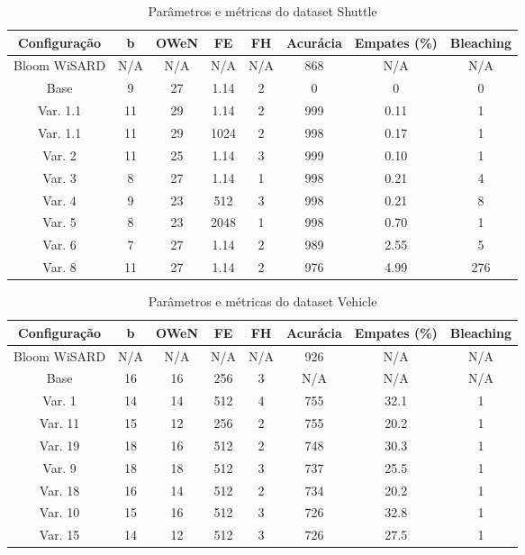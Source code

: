 \documentclass{article}
\begin{document}
{\begin{table}[H]
\caption{Parâmetros e métricas do dataset Shuttle}
\begin{tabular}{|c|c|c|c|c|c|c|c|}
\hline
\textbf{Configuração} & \textbf{b} & \textbf{OWeN} & \textbf{FE} & \textbf{FH} & \textbf{Acurácia} & \textbf{Empates (\%)} & \textbf{Bleaching} \\
\hline
Bloom WiSARD & N/A & N/A & N/A & N/A & 868 & N/A & N/A \\
\hline
Base & 9 & 27 & 1.14 & 2 & 0 & 0 & 0 \\
\hline
Var. 1.1 & 11 & 29 & 1.14 & 2 & 999 & 0.11 & 1 \\
\hline
Var. 1.1 & 11 & 29 & 1024 & 2 & 998 & 0.17 & 1 \\
\hline
Var. 2 & 11 & 25 & 1.14 & 3 & 999 & 0.10 & 1 \\
\hline
Var. 3 & 8 & 27 & 1.14 & 1 & 998 & 0.21 & 4 \\
\hline
Var. 4 & 9 & 23 & 512 & 3 & 998 & 0.21 & 8 \\
\hline
Var. 5 & 8 & 23 & 2048 & 1 & 998 & 0.70 & 1 \\
\hline
Var. 6 & 7 & 27 & 1.14 & 2 & 989 & 2.55 & 5 \\
\hline
Var. 8 & 11 & 27 & 1.14 & 2 & 976 & 4.99 & 276 \\
\hline
\end{tabular}
\end{table}

\begin{table}[H]
\caption{Parâmetros e métricas do dataset Vehicle}
\begin{tabular}{|c|c|c|c|c|c|c|c|}
\hline
\textbf{Configuração} & \textbf{b} & \textbf{OWeN} & \textbf{FE} & \textbf{FH} & \textbf{Acurácia} & \textbf{Empates (\%)} & \textbf{Bleaching} \\
\hline
Bloom WiSARD & N/A & N/A & N/A & N/A & 926 & N/A & N/A \\
\hline
Base & 16 & 16 & 256 & 3 & N/A & N/A & N/A \\
\hline
Var. 1 & 14 & 14 & 512 & 4 & 755 & 32.1 & 1 \\
\hline
Var. 11 & 15 & 12 & 256 & 2 & 755 & 20.2 & 1 \\
\hline
Var. 19 & 18 & 16 & 512 & 2 & 748 & 30.3 & 1 \\
\hline
Var. 9 & 18 & 18 & 512 & 3 & 737 & 25.5 & 1 \\
\hline
Var. 18 & 16 & 14 & 512 & 2 & 734 & 20.2 & 1 \\
\hline
Var. 10 & 15 & 16 & 512 & 3 & 726 & 32.8 & 1 \\
\hline
Var. 15 & 14 & 12 & 512 & 3 & 726 & 27.5 & 1 \\
\hline
\end{tabular}
\end{table}

}
\end{document}
